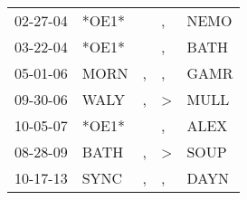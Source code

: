 \begin{supertabular}{lllll}
 02-27-04 &  *OE1* &    &             , &  NEMO \\
 03-22-04 &  *OE1* &    &             , &  BATH \\
 05-01-06 &   MORN &  , &             , &  GAMR \\
 09-30-06 &   WALY &  , &  \textgreater &  MULL \\
 10-05-07 &  *OE1* &    &             , &  ALEX \\
 08-28-09 &   BATH &  , &  \textgreater &  SOUP \\
 10-17-13 &   SYNC &  , &             , &  DAYN \\
\end{supertabular}
